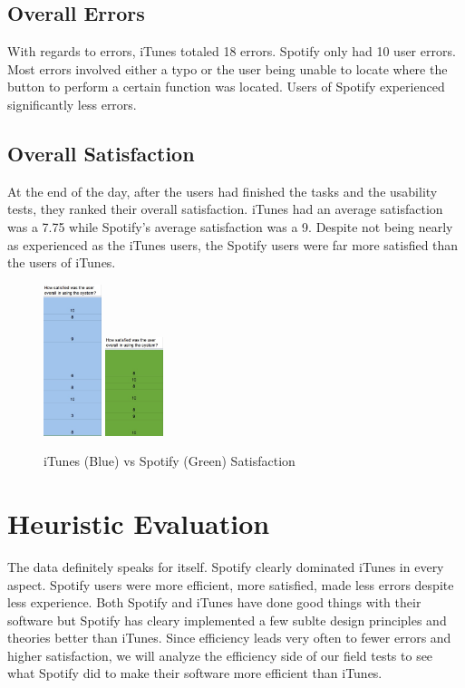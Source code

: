 \documentclass[a4paper]{article}
\begin{document}
\subsection{Overall Errors}
With regards to errors, iTunes totaled 18 errors. Spotify only had 10 user errors. Most errors involved either a typo or the user being unable to locate where the button to perform a certain function was located. Users of Spotify experienced significantly less errors.

\subsection{Overall Satisfaction}
  At the end of the day, after the users had finished the tasks and the usability tests, they ranked their overall satisfaction. iTunes had an average satisfaction was a 7.75 while Spotify's average satisfaction was a 9. Despite not being nearly as experienced as the iTunes users, the Spotify users were far more satisfied than the users of iTunes.
\begin{figure}[H]
\centering
\includegraphics[width=0.15\textwidth]{itunes_satis.jpg}
\includegraphics[width=0.15\textwidth]{spotifysatis__copy.jpg}
\caption{\label{overall: satisfactionSpotify} iTunes (Blue) vs Spotify (Green) Satisfaction}
\end{figure}

\section{Heuristic Evaluation}
\label{sec:heuristicEval}
The data definitely speaks for itself. Spotify clearly dominated iTunes in every aspect. Spotify users were more efficient, more satisfied, made less errors despite less experience. Both Spotify and iTunes have done good things with their software but Spotify has cleary implemented a few sublte design principles and theories better than iTunes. Since efficiency leads very often to fewer errors and higher satisfaction, we will analyze the efficiency side of our field tests to see what Spotify did to make their software more efficient than iTunes.
\end{document}
